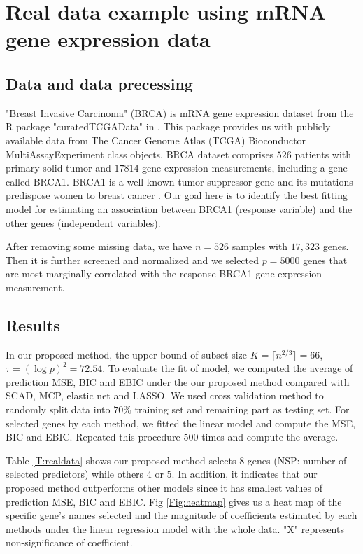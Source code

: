 \documentclass[12pt]{article}
\begin{document}
\section{Real data example using mRNA gene expression data}
\subsection{Data and data precessing}
"Breast Invasive Carcinoma" (BRCA) is mRNA gene expression dataset from the R package "curatedTCGAData" in \citet{Ramos2019}. This package provides us with publicly available data from The Cancer Genome Atlas (TCGA) Bioconductor MultiAssayExperiment class objects. BRCA dataset comprises $526$ patients with primary solid tumor and $17814$ gene expression measurements, including a gene called BRCA1. BRCA1 is a well-known tumor suppressor gene and its mutations predispose women to breast cancer \citep{findlay2018accurate}. Our goal here is to identify the best fitting model for estimating an association between BRCA1 (response variable) and the other genes (independent variables).

After removing some missing data, we have $n=526$ samples with $17,323$ genes. Then it is further screened and normalized and we selected $p=5000$ genes that are most marginally correlated with the response BRCA1 gene expression measurement.
\subsection{Results}
In our proposed method, the upper bound of subset size $K=\lceil n^{2/3} \rceil =66$, $\tau=(\log p)^2=72.54$. To evaluate the fit of model, we computed the average of prediction MSE, BIC and EBIC under the our proposed method compared with SCAD, MCP, elastic net and LASSO. We used cross validation method to randomly split data into $70\%$ training set and remaining part as testing set. For selected genes by each method, we fitted the linear model and compute the MSE, BIC and EBIC. Repeated this procedure $500$ times and compute the average.

Table \ref{T:realdata} shows our proposed method selects $8$ genes (NSP: number of selected predictors) while others $4$ or $5$. In addition, it indicates that our proposed method outperforms other models since it has smallest values of prediction MSE, BIC and EBIC. Fig \ref{Fig:heatmap} gives us a heat map of the specific gene's names selected and the magnitude of coefficients estimated by each methods under the linear regression model with the whole data. "X" represents non-significance of coefficient.
\end{document}
